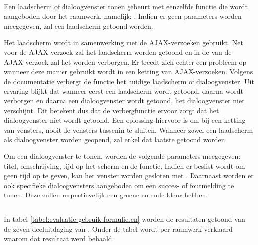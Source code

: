 \paragraph{\lungo}
Een laadscherm of dialoogvenster tonen gebeurt met eenzelfde functie die wordt aangeboden door het raamwerk, namelijk: .
Indien er geen parameters worden meegegeven, zal een laadscherm getoond worden.

Het laadscherm wordt in samenwerking met de AJAX-verzoeken gebruikt.
Net voor de AJAX-verzoek zal het laadscherm worden getoond en in de  van de AJAX-verzoek zal het worden verborgen.
Er treedt zich echter een probleem op wanneer deze manier gebruikt wordt in een ketting van AJAX-verzoeken.
Volgens de documentatie verbergt de functie  het huidige laadscherm of dialoogvenster. 
Uit ervaring blijkt dat wanneer eerst een laadscherm wordt getoond, daarna wordt verborgen en daarna een dialoogvenster wordt getoond, het dialoogvenster niet verschijnt.
Dit betekent dus dat de verbergfunctie ervoor zorgt dat het dialoogvenster niet wordt getoond.
Een oplossing hiervoor is om bij een ketting van vensters, nooit de vensters tussenin te sluiten.
Wanneer zowel een laadscherm als dialoogvenster worden geopend, zal enkel dat laatste getoond worden.

Om een dialoogvenster te tonen, worden de volgende parameters meegegeven: titel, omschrijving, tijd op het scherm en de  functie.
Indien er beslist wordt om geen tijd op te geven, kan het venster worden gesloten met .
Daarnaast worden er ook specifieke dialoogvensters aangeboden om een succes- of foutmelding te tonen.
Deze zullen respectievelijk een groene en rode kleur hebben.



\subsection{}
\label{sec:evaluatie-gebruik-formulieren}

In tabel \ref{tabel:evaluatie-gebruik-formulieren} worden de resultaten getoond van de zeven deeluitdaging van .
Onder de tabel wordt per raamwerk verklaard waarom dat resultaat werd behaald.


